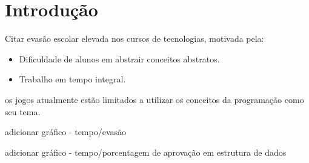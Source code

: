 \chapter{Introdução}

Citar evasão escolar elevada nos cursos de tecnologias, motivada pela:

\begin{itemize}
	\item Dificuldade de alunos em abstrair conceitos abstratos.
	\item Trabalho em tempo integral.
\end{itemize}

os jogos atualmente estão limitados a utilizar os conceitos da programação como seu tema. \cite{de2025codebo}

adicionar gráfico - tempo/evasão

adicionar gráfico - tempo/porcentagem de aprovação em estrutura de dados

